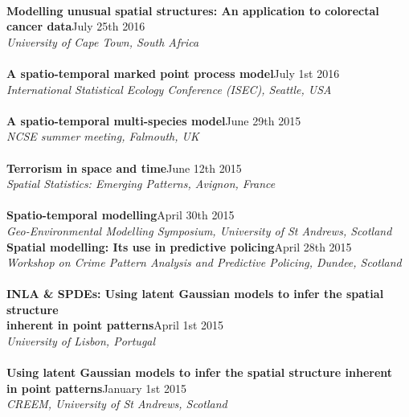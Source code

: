 \documentclass[10pt,letter]{article}
\begin{document}
\hdashrule[0.5ex]{4cm}{1pt}{1pt}\\
{\textbf{Modelling unusual spatial structures: An application to colorectal cancer data}}\hfill July 25th 2016\\
 {\sl University of Cape Town, South Africa}\\
\hdashrule[0.5ex]{4cm}{1pt}{1pt}\\
{\textbf{A spatio-temporal marked point process model}}\hfill July 1st 2016\\
 {\sl International Statistical Ecology Conference (ISEC), Seattle, USA}\\
  \hdashrule[0.5ex]{4cm}{1pt}{1pt}\\
 {\textbf{A spatio-temporal multi-species model}}\hfill June 29th 2015\\
 {\sl NCSE summer meeting, Falmouth, UK}\\
 \hdashrule[0.5ex]{4cm}{1pt}{1pt}\\
{\textbf{Terrorism in space and time}}\hfill June 12th 2015\\
 {\sl Spatial Statistics: Emerging Patterns, Avignon, France}\\
 \hdashrule[0.5ex]{4cm}{1pt}{1pt}\\
 {\textbf{Spatio-temporal modelling}}\hfill April 30th 2015\\
 {\sl Geo-Environmental Modelling Symposium, University of St Andrews, Scotland}\\
 \newpage
 \noindent
{\textbf{Spatial modelling: Its use in predictive policing}}\hfill April 28th 2015\\
{\sl Workshop on Crime Pattern Analysis and Predictive Policing, Dundee, Scotland}\\
\hdashrule[0.5ex]{4cm}{1pt}{1pt}\\
{\textbf{INLA \& SPDEs: Using latent Gaussian models to infer the spatial structure \\
inherent in point patterns}}\hfill April 1st 2015\\
 {\sl University of Lisbon, Portugal}\\
 \hdashrule[0.5ex]{4cm}{1pt}{1pt}\\
 {\textbf{Using latent Gaussian models to infer the spatial
structure inherent \\in point patterns}}\hfill January 1st 2015\\
 {\sl CREEM, University of St Andrews, Scotland}\\
\end{document}
